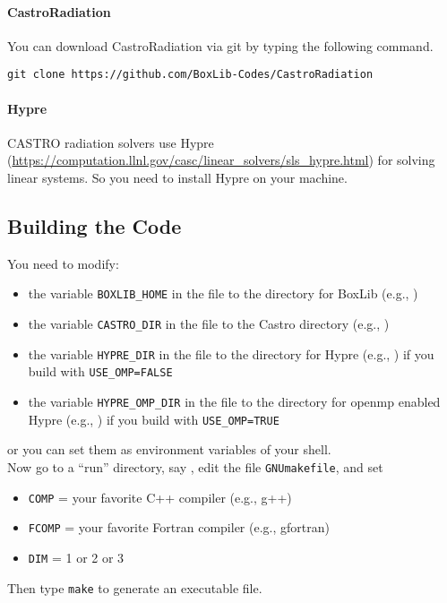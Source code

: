 \documentclass[11pt,letterpaper]{article}
\begin{document}
\paragraph{CastroRadiation} You can download CastroRadiation via git
by typing the following command.
\vspace{5pt}

\verb|git clone https://github.com/BoxLib-Codes/CastroRadiation|

\paragraph{Hypre} CASTRO radiation solvers use Hypre
(\url{https://computation.llnl.gov/casc/linear_solvers/sls_hypre.html})
for solving linear systems.  So you need to install Hypre on your
machine.

\subsection{Building the Code}

You need to modify:
\begin{itemize}
\item the variable {\tt BOXLIB\_HOME} in the file
  {\tt{}} to the
  directory for BoxLib (e.g., {\tt{}})
\item the variable {\tt CASTRO\_DIR} in the file
  {\tt{}} to
  the Castro directory
  (e.g., {\tt{}})
\item the variable {\tt HYPRE\_DIR} in the file
  {\tt{}} to
  the directory for Hypre (e.g., {\tt{}})
  if you build with {\tt USE\_OMP=FALSE}
\item the variable {\tt HYPRE\_OMP\_DIR} in the file
  {\tt{}} to
  the directory for openmp enabled Hypre (e.g., {\tt{}})
  if you build with {\tt USE\_OMP=TRUE}
\end{itemize}
or you can set them as environment variables of your shell.  \\


Now go to a ``run'' directory, say
{\tt{}},
edit the file {\tt GNUmakefile}, and set
\begin{itemize}
\item {\tt COMP} = your favorite C++ compiler (e.g., g++)
\item {\tt FCOMP} = your favorite Fortran compiler (e.g., gfortran)
\item {\tt DIM}   = 1 or 2 or 3
\end{itemize}
Then type {\tt make} to generate an executable file.  
\end{document}

